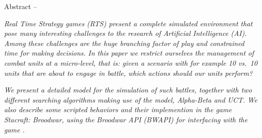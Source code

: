 \begin{bfseries} Abstract -- \end{bfseries}
\emph{
Real Time Strategy games (RTS) present a complete simulated environment that pose many interesting challenges to the research of Artificial Intelligence (AI).
Among these challenges are the huge branching factor of play and constrained time for making decisions.
In this paper we restrict ourselves the management of combat units at a micro-level, that is: given a scenario with for example 10 vs.\ 10 units that are about to engage in battle, which actions should our units perform?
}

\emph{
We present a detailed model for the simulation of such battles, together with two different searching algorithms making use of the model, Alpha-Beta and UCT.
We also describe some scripted behaviors and their implemention in the game Stacraft: Broodwar, using the Broodwar API (BWAPI) for interfacing with the game \cite{BWAPI}.
}
